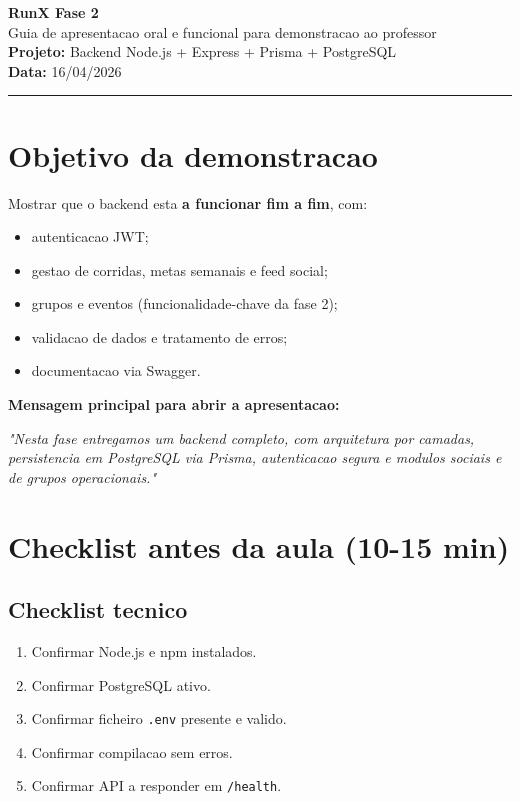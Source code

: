 \documentclass[11pt,a4paper]{article}
\begin{document}
{\LARGE \textbf{RunX Fase 2}}\\[4pt]
{\large Guia de apresentacao oral e funcional para demonstracao ao professor}\\[10pt]
\textbf{Projeto:} Backend Node.js + Express + Prisma + PostgreSQL\\
\textbf{Data:} 16/04/2026

\vspace{8pt}
\hrule
\vspace{8pt}

\section{Objetivo da demonstracao}

Mostrar que o backend esta \textbf{a funcionar fim a fim}, com:

\begin{itemize}
  \item autenticacao JWT;
  \item gestao de corridas, metas semanais e feed social;
  \item grupos e eventos (funcionalidade-chave da fase 2);
  \item validacao de dados e tratamento de erros;
  \item documentacao via Swagger.
\end{itemize}

\textbf{Mensagem principal para abrir a apresentacao:}

\textit{"Nesta fase entregamos um backend completo, com arquitetura por camadas, persistencia em PostgreSQL via Prisma, autenticacao segura e modulos sociais e de grupos operacionais."}

\section{Checklist antes da aula (10-15 min)}

\subsection{Checklist tecnico}

\begin{enumerate}
  \item Confirmar Node.js e npm instalados.
  \item Confirmar PostgreSQL ativo.
  \item Confirmar ficheiro \texttt{.env} presente e valido.
  \item Confirmar compilacao sem erros.
  \item Confirmar API a responder em \texttt{/health}.
\end{enumerate}
\end{document}
